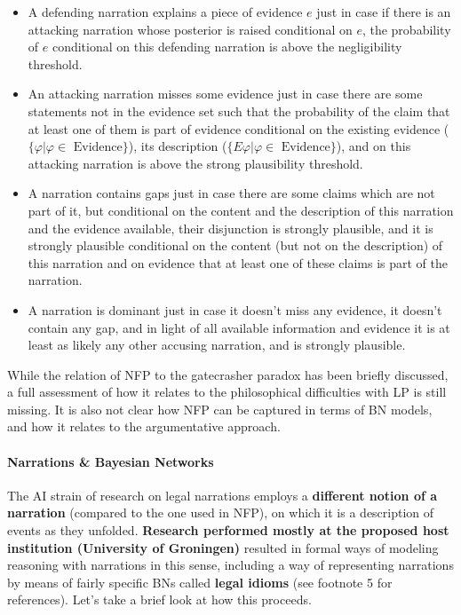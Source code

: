 \documentclass[11pt, a4paper]{article}
\begin{document}
 \begin{itemize}\setlength\itemsep{-1.5mm}
 \item A defending narration explains  a piece of evidence  $e$ just in case  if there is an  attacking narration whose posterior is raised conditional on $e$, the probability of $e$ conditional on this defending narration is above the negligibility threshold.
 \item An attacking narration misses some evidence just in case there are some statements not in the evidence set such that the probability of the claim that at least one of them is part of evidence conditional on the existing evidence ($\{\varphi\vert \varphi \in \mbox{ Evidence}\}$), its description ($\{E\varphi\vert \varphi \in \mbox{ Evidence}\}$), and on this attacking narration is above the strong plausibility threshold. 
 \item A narration contains gaps just in case there are some claims which are not part of it, but conditional on the content and the description of this narration and the evidence available, their disjunction is strongly plausible, and it is strongly plausible conditional on the content (but not on the description) of this narration and on evidence that at least one of these claims is part of the narration.
 \item  A narration is dominant just in case it doesn't miss any evidence, it doesn’t contain any gap, and in light of all available information and evidence it is at least as likely any other accusing narration, and is strongly plausible.
 \end{itemize}

\vspace{-4mm}

 While the relation of NFP to the gatecrasher paradox has been briefly discussed, a full assessment of how it relates to the philosophical difficulties with LP is still missing. It is also not clear how NFP can be captured in terms of BN models, and how it relates to the argumentative approach.


\vspace{-5mm}

\paragraph{Narrations \& Bayesian Networks} The AI strain of research on legal narrations employs a \textbf{different notion of a narration} (compared to the one used in NFP), on which it is  a description of events as they unfolded.   \textbf{Research performed mostly  at the proposed host institution (University of Groningen)}   resulted in  formal ways of modeling reasoning with narrations in this  sense, including a way of representing narrations by means of fairly specific BNs called \textbf{legal idioms} (see footnote 5 for references). %
   Let's take a brief look at how this proceeds. 
\end{document}
